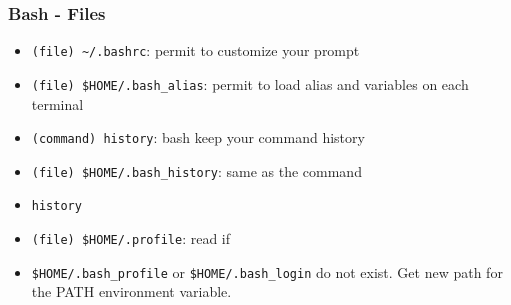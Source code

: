 \subsubsection{Bash - Files}
\begin{frame}[fragile]{\subsubsecname}
  \begin{itemize}
    \item \texttt{(file) \textasciitilde{}/.bashrc}: permit to customize your prompt
    \item \texttt{(file) \$HOME/.bash\_alias}: permit to load alias and variables on each terminal
    \item \texttt{(command) history}: bash keep your command history
    \item \texttt{(file) \$HOME/.bash\_history}: same as the command \item \texttt{history}
    \item \texttt{(file) \$HOME/.profile}: read if \item \texttt{\$HOME/.bash\_profile} or \texttt{\$HOME/.bash\_login} do not exist. Get new path for the PATH environment variable.
  \end{itemize}
\end{frame}
